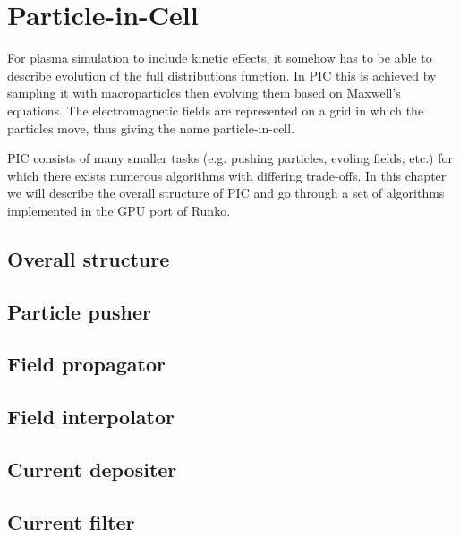 \chapter{Particle-in-Cell}

For plasma simulation to include kinetic effects, it somehow has to be able to describe
evolution of the full distributions function. In PIC this is achieved by sampling
it with macroparticles then evolving them based on Maxwell's equations.
The electromagnetic fields are represented on a grid in which the particles move,
thus giving the name particle-in-cell.

PIC consists of many smaller tasks (e.g. pushing particles, evoling fields, etc.)
for which there exists numerous algorithms with differing trade-offs.
In this chapter we will describe the overall structure of PIC and go through
a set of algorithms implemented in the GPU port of Runko.

\section{Overall structure}
\section{Particle pusher}
\section{Field propagator}
\section{Field interpolator}
\section{Current depositer}
\section{Current filter}


